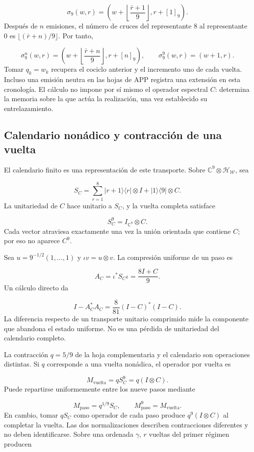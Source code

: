 \[
\sigma_9(w,r)=
\left(w+\left\lfloor\frac{\bar r+1}{9}\right\rfloor,r+[1]_9\right).
\]
Después de \(n\) emisiones, el número de cruces del representante \(8\) al representante \(0\) es \(\lfloor(\bar r+n)/9\rfloor\). Por tanto,

\[
\sigma_9^n(w,r)=
\left(w+\left\lfloor\frac{\bar r+n}{9}\right\rfloor,r+[n]_9\right),
\qquad
\sigma_9^9(w,r)=(w+1,r).
\]
Tomar \(q_k=w_k\) recupera el cociclo anterior y el incremento uno de cada vuelta. Incluso una emisión neutra en las hojas de APP registra una extensión en esta cronología. El cálculo no impone por sí mismo el operador espectral \(C\): determina la memoria sobre la que actúa la realización, una vez establecido su entrelazamiento.

\subsection{Calendario nonádico y contracción de una vuelta}
\label{rz:calendario}
El calendario finito es una representación de este transporte. Sobre \(\mathbb C^9\otimes\mathcal H_{\mathscr W}\), sea

\[
S_C=\sum_{r=1}^{8}|r+1\rangle\langle r|\otimes I
+|1\rangle\langle9|\otimes C.
\]
La unitariedad de \(C\) hace unitario a \(S_C\), y la vuelta completa satisface

\[
S_C^9=I_{\mathbb C^9}\otimes C.
\]
Cada vector atraviesa exactamente una vez la unión orientada que contiene \(C\); por eso no aparece \(C^9\).

Sea \(u=9^{-1/2}(1,\ldots,1)\) y \(\iota v=u\otimes v\). La compresión uniforme de un paso es

\[
A_C=\iota^*S_C\iota=\frac{8I+C}{9}.
\]
Un cálculo directo da

\[
I-A_C^*A_C
=\frac8{81}(I-C)^*(I-C).
\]
La diferencia respecto de un transporte unitario comprimido mide la componente que abandona el estado uniforme. No es una pérdida de unitariedad del calendario completo.

La contracción \(q=5/9\) de la hoja complementaria y el calendario son operaciones distintas. Si \(q\) corresponde a una vuelta nonádica, el operador por vuelta es

\[
M_{\mathrm{vuelta}}=qS_C^9
=q(I\otimes C).
\]
Puede repartirse uniformemente entre los nueve pasos mediante

\[
M_{\mathrm{paso}}=q^{1/9}S_C,\qquad
M_{\mathrm{paso}}^9=M_{\mathrm{vuelta}}.
\]
En cambio, tomar \(qS_C\) como operador de cada paso produce \(q^9(I\otimes C)\) al completar la vuelta. Las dos normalizaciones describen contracciones diferentes y no deben identificarse. Sobre una ordenada \(\gamma\), \(r\) vueltas del primer régimen producen

